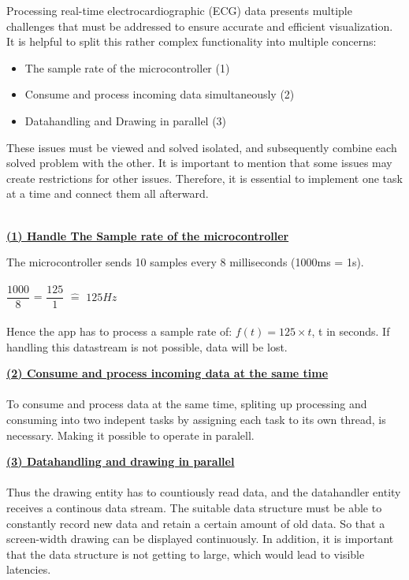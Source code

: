 {\large
	 Processing real-time electrocardiographic (ECG) data presents multiple challenges that must be addressed to ensure accurate and efficient visualization. It is helpful to split this rather complex functionality into multiple concerns:
	\begin{itemize}
		\item The sample rate of the microcontroller (1)
		\item Consume and process incoming data simultaneously (2)
		\item Datahandling and Drawing in parallel (3)
	\end{itemize}
	These issues must be viewed and solved isolated, and subsequently combine each solved problem with the other. It is important to mention that some issues may create restrictions for other issues. Therefore, it is essential to implement one task at a time and connect them all afterward.\mbox{}\\
	\mbox{}\\
	
	
	{\textbf{\underline{(1) Handle The Sample rate of the microcontroller}}
	
	The microcontroller sends 10 samples every 8 milliseconds (1000ms = 1s). \\
	\\
	$\dfrac{1000}{8}$ = $\dfrac{125}{1}$   $\widehat{=}$   $125 Hz$ \\
	\\
	Hence the app has to process a sample rate of: $f(t)= 125 \times t $, t in seconds. 
	If handling this datastream is not possible, data will be lost.
	
	
	
	
	\textbf{\underline{(2) Consume and process incoming data at the same time}}\\
	\\
	To consume and process data at the same time,  spliting up processing and consuming into two indepent tasks by assigning each task to its own thread, is necessary. Making it possible to operate in paralell.
	
	
	
	


	\hfil \break
 	\textbf{\underline{(3) Datahandling and drawing in parallel}}\\
 	\\
 	Thus the drawing entity has to countiously read data, and the datahandler entity receives a continous data stream.
 	The suitable data structure must be able to constantly record new data and retain a certain amount of old data. So that a screen-width drawing can be displayed continuously. In addition, it is important that the data structure is not getting to large, which would lead to visible latencies. 
 	
}}
